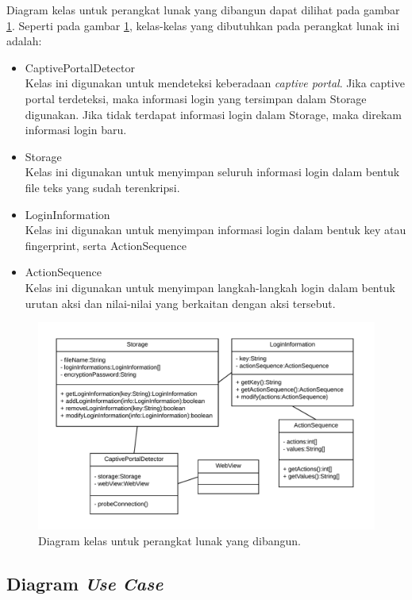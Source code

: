 Diagram kelas untuk perangkat lunak yang dibangun dapat dilihat pada gambar \ref{fig:diagramkelas}. Seperti pada gambar \ref{fig:diagramkelas}, kelas-kelas yang dibutuhkan pada perangkat lunak ini adalah:

\begin{itemize}
    \item{CaptivePortalDetector\\Kelas ini digunakan untuk mendeteksi keberadaan \textit{captive portal}. Jika captive portal terdeteksi, maka informasi login yang tersimpan dalam Storage digunakan. Jika tidak terdapat informasi login dalam Storage, maka direkam informasi login baru.}
    \item{Storage\\Kelas ini digunakan untuk menyimpan seluruh informasi login dalam bentuk file teks yang sudah terenkripsi.}
    \item{LoginInformation\\Kelas ini digunakan untuk menyimpan informasi login dalam bentuk key atau fingerprint, serta ActionSequence}
    \item{ActionSequence\\Kelas ini digunakan untuk menyimpan langkah-langkah login dalam bentuk urutan aksi dan nilai-nilai yang berkaitan dengan aksi tersebut.}
\end{itemize}

\begin{figure}[h]
    \centering
    \includegraphics[scale=0.85]{Gambar/classdiagram.png}
    \caption[Diagram kelas untuk perangkat lunak yang dibangun.]{Diagram kelas untuk perangkat lunak yang dibangun.}
    \label{fig:diagramkelas}
\end{figure}

\subsection{Diagram \textit{Use Case}}

